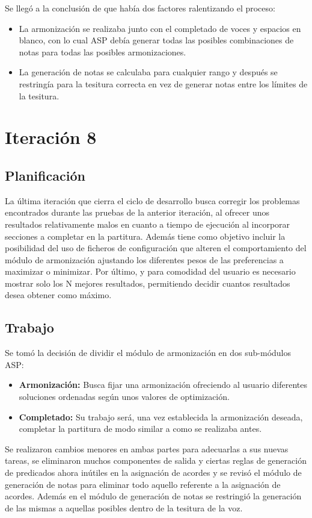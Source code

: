 Se llegó a la conclusión de que había dos factores ralentizando el proceso:
\begin{itemize}
	\item La armonización se realizaba junto con el completado de voces y espacios en blanco, con lo cual ASP debía generar todas las posibles combinaciones de notas para todas las posibles armonizaciones.
	\item La generación de notas se calculaba para cualquier rango y después se restringía para la tesitura correcta en vez de generar notas entre los límites de la tesitura. 
\end{itemize}

\section{Iteración 8}
\subsection{Planificación}
La última iteración que cierra el ciclo de desarrollo busca corregir los problemas encontrados durante las pruebas de la anterior iteración, al ofrecer unos resultados relativamente malos en cuanto a tiempo de ejecución al incorporar secciones a completar en la partitura. Además tiene como objetivo incluir la posibilidad del uso de ficheros de configuración que alteren el comportamiento del módulo de armonización ajustando los diferentes pesos de las preferencias a maximizar o minimizar. Por último, y para comodidad del usuario es necesario mostrar solo los N mejores resultados, permitiendo decidir cuantos resultados desea obtener como máximo.

\subsection{Trabajo}
Se tomó la decisión de dividir el módulo de armonización en dos sub-módulos ASP:
\begin{itemize}
	\item \textbf{Armonización:} Busca fijar una armonización ofreciendo al usuario diferentes soluciones ordenadas según unos valores de optimización.
	\item \textbf{Completado:} Su trabajo será, una vez establecida la armonización deseada, completar la partitura de modo similar a como se realizaba antes.
\end{itemize}

Se realizaron cambios menores en ambas partes para adecuarlas a sus nuevas tareas, se eliminaron muchos componentes de salida y ciertas reglas de generación de predicados ahora inútiles en la asignación de acordes y se revisó el módulo de generación de notas para eliminar todo aquello referente a la asignación de acordes. Además en el módulo de generación de notas se restringió la generación de las mismas a aquellas posibles dentro de la tesitura de la voz.

